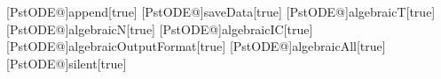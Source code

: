 [PstODE@]{append}[true]{}%
[PstODE@]{saveData}[true]{}%
[PstODE@]{algebraicT}[true]{}%
[PstODE@]{algebraicN}[true]{}%
[PstODE@]{algebraicIC}[true]{}%
[PstODE@]{algebraicOutputFormat}[true]{}%
[PstODE@]{algebraicAll}[true]{}%
[PstODE@]{silent}[true]{}%
%
%
\def\pstODEsolve{\def\pst@par{}\pst@object{pstODEsolve}}%
